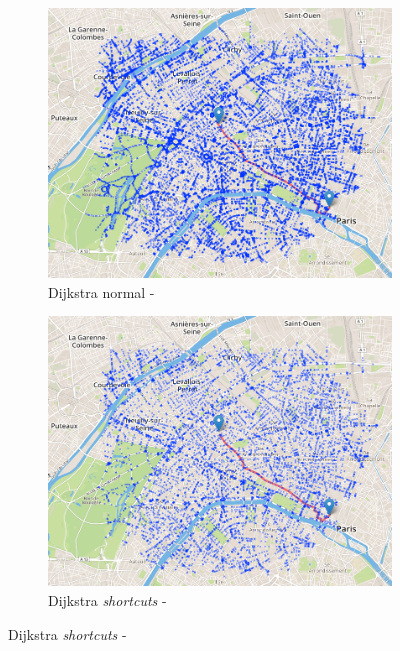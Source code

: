 \documentclass[a4paper, 11pt, DIV=12, numbers=enddot]{scrartcl}
\begin{document}
\begin{figure}[!h]
  \centering
  \begin{subfigure}[b]{.49\textwidth}
    \includegraphics[width=\textwidth]{fig/dijkstra.png}
    \caption{Dijkstra normal - }
  \end{subfigure}
  \hfill
  \begin{subfigure}[b]{.49\textwidth}
    \includegraphics[width=\textwidth]{fig/dijkstra_hl.png}
    \caption{Dijkstra \emph{shortcuts} - }
  \end{subfigure}
  \newline\newline

\end{figure}
\end{document}
